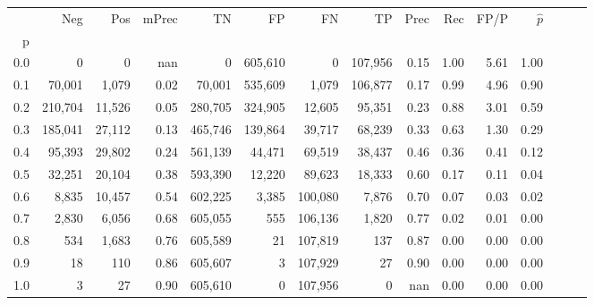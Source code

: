 \begin{tabular}{rrrrrrrrrrrrrrr}
\toprule
{} &      Neg &     Pos & mPrec &       TN &       FP &       FN &       TP &  Prec &   Rec &  FP/P & $\hat{p}$ \\
p   &          &         &       &          &          &          &          &       &       &       &           \\
\midrule
0.0 &        0 &       0 &   nan &        0 &  605,610 &        0 &  107,956 &  0.15 &  1.00 &  5.61 &      1.00 \\
0.1 &   70,001 &   1,079 &  0.02 &   70,001 &  535,609 &    1,079 &  106,877 &  0.17 &  0.99 &  4.96 &      0.90 \\
0.2 &  210,704 &  11,526 &  0.05 &  280,705 &  324,905 &   12,605 &   95,351 &  0.23 &  0.88 &  3.01 &      0.59 \\
0.3 &  185,041 &  27,112 &  0.13 &  465,746 &  139,864 &   39,717 &   68,239 &  0.33 &  0.63 &  1.30 &      0.29 \\
0.4 &   95,393 &  29,802 &  0.24 &  561,139 &   44,471 &   69,519 &   38,437 &  0.46 &  0.36 &  0.41 &      0.12 \\
0.5 &   32,251 &  20,104 &  0.38 &  593,390 &   12,220 &   89,623 &   18,333 &  0.60 &  0.17 &  0.11 &      0.04 \\
0.6 &    8,835 &  10,457 &  0.54 &  602,225 &    3,385 &  100,080 &    7,876 &  0.70 &  0.07 &  0.03 &      0.02 \\
0.7 &    2,830 &   6,056 &  0.68 &  605,055 &      555 &  106,136 &    1,820 &  0.77 &  0.02 &  0.01 &      0.00 \\
0.8 &      534 &   1,683 &  0.76 &  605,589 &       21 &  107,819 &      137 &  0.87 &  0.00 &  0.00 &      0.00 \\
0.9 &       18 &     110 &  0.86 &  605,607 &        3 &  107,929 &       27 &  0.90 &  0.00 &  0.00 &      0.00 \\
1.0 &        3 &      27 &  0.90 &  605,610 &        0 &  107,956 &        0 &   nan &  0.00 &  0.00 &      0.00 \\
\bottomrule
\end{tabular}
